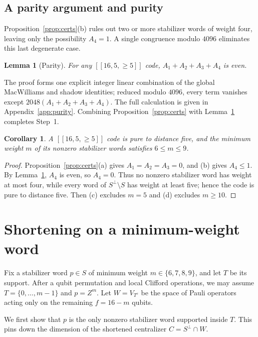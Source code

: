 \documentclass[11pt]{article}
\newtheorem{lemma}[theorem]{Lemma}
\newtheorem{corollary}[theorem]{Corollary}
\theoremstyle{definition}
\theoremstyle{remark}
\newcommand{\qc}[1]{[\![#1]\!]}
\begin{document}
\subsection{A parity argument and purity}

Proposition~\ref{prop:certs}(b) rules out two or more stabilizer words
of weight four, leaving only the possibility \(A_4=1\). A single
congruence modulo \(4096\) eliminates this last degenerate case.

\begin{lemma}[Parity]\label{lem:parity}
For any \(\qc{16,5,{\geq}5}\) code, \(A_1+A_2+A_3+A_4\) is even.
\end{lemma}

The proof forms one explicit integer linear combination of the global
MacWilliams and shadow identities; reduced modulo \(4096\), every term
vanishes except \(2048(A_1+A_2+A_3+A_4)\). The full calculation is given
in Appendix~\ref{app:purity}. Combining Proposition~\ref{prop:certs}
with Lemma~\ref{lem:parity} completes Step~1.

\begin{corollary}\label{cor:pure}
A \(\qc{16,5,{\geq}5}\) code is pure to distance five, and the minimum
weight \(m\) of its nonzero stabilizer words satisfies \(6\leq m\leq9\).
\end{corollary}
\begin{proof}
Proposition~\ref{prop:certs}(a) gives \(A_1=A_2=A_3=0\), and (b) gives
\(A_4\leq1\). By Lemma~\ref{lem:parity}, \(A_4\) is even, so \(A_4=0\).
Thus no nonzero stabilizer word has weight at most four, while every
word of \(S^\perp\setminus S\) has weight at least five; hence the code
is pure to distance five. Then (c) excludes \(m=5\) and (d) excludes
\(m\geq10\).
\end{proof}

\section{Shortening on a minimum-weight word}\label{sec:shorten}

Fix a stabilizer word \(p\in S\) of minimum weight \(m\in\{6,7,8,9\}\),
and let \(T\) be its support. After a qubit permutation and local Clifford operations, we may assume
\(T=\{0,\ldots,m-1\}\) and \(p=Z^m\). Let \(W=V_{T^c}\) be the space of
Pauli operators acting only on the remaining \(f=16-m\) qubits.

We first show that \(p\) is the only nonzero stabilizer word supported
inside \(T\). This pins down the dimension of the shortened centralizer
\(C=S^\perp\cap W\).
\end{document}

